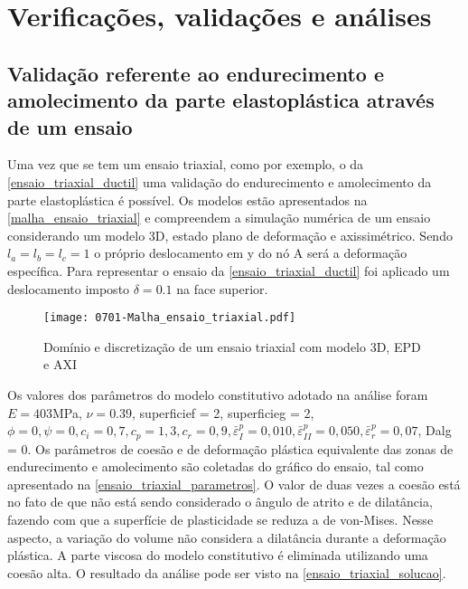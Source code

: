 \chapter{Verificações, validações e análises}\label{Algumas_verificacoes_validacoes}

\section{Validação referente ao endurecimento e amolecimento da parte elastoplástica através de um ensaio}

Uma vez que se tem um ensaio triaxial, como por exemplo, o da \autoref{ensaio_triaxial_ductil} uma validação do endurecimento e amolecimento da parte elastoplástica é possível. Os modelos estão apresentados na \autoref{malha_ensaio_triaxial} e compreendem a simulação numérica de um ensaio considerando um modelo 3D, estado plano de deformação e axissimétrico. Sendo $l_a = l_b = l_c = 1$ o próprio deslocamento em y do nó A será a deformação específica. Para representar o ensaio da \autoref{ensaio_triaxial_ductil} foi aplicado um deslocamento imposto $\delta = 0.1$ na face superior.

\begin{figure}[H]
	\begin{center}
		\texttt{[image: 0701-Malha\_ensaio\_triaxial.pdf]}
	\end{center}
	\caption{\label{malha_ensaio_triaxial}Domínio e discretização de um ensaio triaxial com modelo 3D, EPD e AXI}
\end{figure}

Os valores dos parâmetros do modelo constitutivo adotado na análise foram $E = 403$MPa, $\nu = 0.39$,  superficief = 2, superficieg = 2, $\phi = 0, \psi = 0, c_i = 0,7, c_p = 1,3, c_r = 0,9, \bar \varepsilon^p_{I} = 0,010, \bar \varepsilon^p_{II} = 0,050, \bar \varepsilon^p_{r} = 0,07$, Dalg = 0. Os parâmetros de coesão e de deformação plástica equivalente das zonas de endurecimento e amolecimento são coletadas do gráfico do ensaio, tal como apresentado na \autoref{ensaio_triaxial_parametros}. O valor de duas vezes a coesão está no fato de que não está sendo considerado o ângulo de atrito e de dilatância, fazendo com que a superfície de plasticidade se reduza a de von-Mises. Nesse aspecto, a variação do volume não considera a dilatância durante a deformação plástica. A parte viscosa do modelo constitutivo é eliminada utilizando uma coesão alta. O resultado da análise pode ser visto na \autoref{ensaio_triaxial_solucao}.
 
